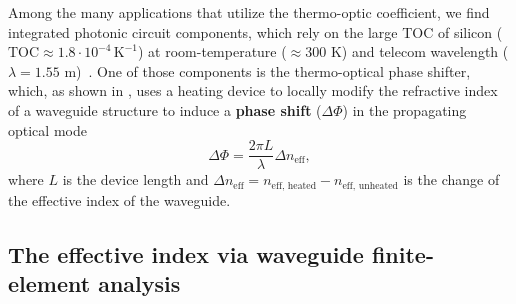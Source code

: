 Among the many applications that utilize the thermo-optic coefficient, we find integrated photonic circuit components, which rely on the large 
TOC of silicon ($\text{TOC} \approx 1.8 \cdot 10^{-4}\, \text{K}^{-1}$) at room-temperature ($\approx300$ K) and telecom wavelength 
($\lambda=1.55$ \textmu m)~\cite{thermo-optic-coef}. One of those components is the thermo-optical phase shifter, which, as shown in ,
uses a heating device to locally modify the refractive index of a waveguide structure to induce a \textbf{phase shift} ($\Delta \Phi$) in the propagating optical mode
\begin{equation*}
\Delta \Phi = \frac{2\pi L}{\lambda} \Delta n_\text{eff},
\end{equation*}
where $L$ is the device length and $\Delta n_\text{eff} = n_\text{eff, heated} - n_\text{eff, unheated}$ is the change of the effective index of the waveguide. 

\subsection*{The effective index via waveguide finite-element analysis}

